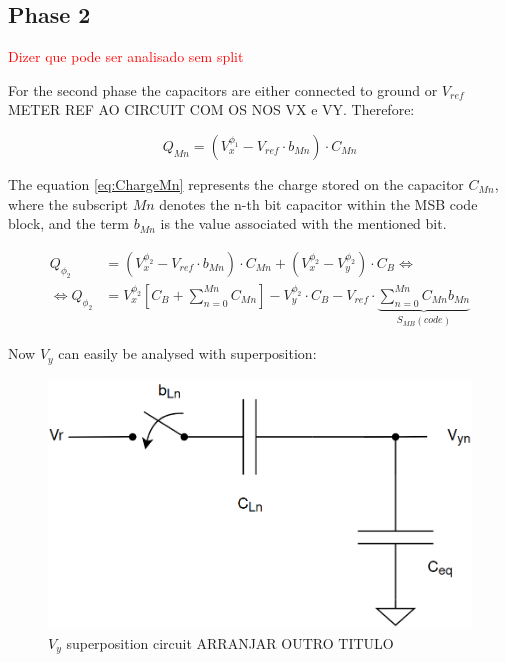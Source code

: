 \subsection{Phase 2}

\textcolor{red}{Dizer que pode ser analisado sem split}

For the second phase the capacitors are either connected to ground or $V_{ref}$ METER REF AO CIRCUIT COM OS NOS VX e VY. Therefore:

\begin{equation}
    Q_{Mn} = (V_x^{\phi_1} - V_{ref}\cdot b_{Mn})\cdot C_{Mn}
    \label{eq:ChargeMn}
\end{equation}

The equation \ref{eq:ChargeMn} represents the charge stored on the capacitor $C_{Mn}$, where the subscript $Mn$ denotes the n-th bit capacitor within the MSB code block, and the term $b_{Mn}$ is the value associated with the mentioned bit.

\begin{equation}
    \begin{split}   
        Q_{\phi_2} &= (V_x^{\phi_2} - V_{ref}\cdot b_{Mn})\cdot C_{Mn} + (V_x^{\phi_2} - V_y^{\phi_2})\cdot C_B \Leftrightarrow \\
       \Leftrightarrow Q_{\phi_2} &= V_x^{\phi_2}\left[C_B + \sum_{n=0}^{Mn}C_{Mn}\right]-V_{y}^{\phi_2}\cdot C_B - V_{ref}\cdot\underbrace{\sum_{n=0}^{Mn}C_{Mn} b_{Mn}}_{S_{MB}(code)}
    \end{split}
    \label{eq:ChargeP2}
\end{equation}

Now $V_y$ can easily be analysed with superposition:


\begin{figure}[H]
    \centering
    \includegraphics*[scale = 0.35]{Images/VySuperposition.png}
    \caption{$V_y$ superposition circuit ARRANJAR OUTRO TITULO}
    \label{fig:VySuperposition}
\end{figure}

